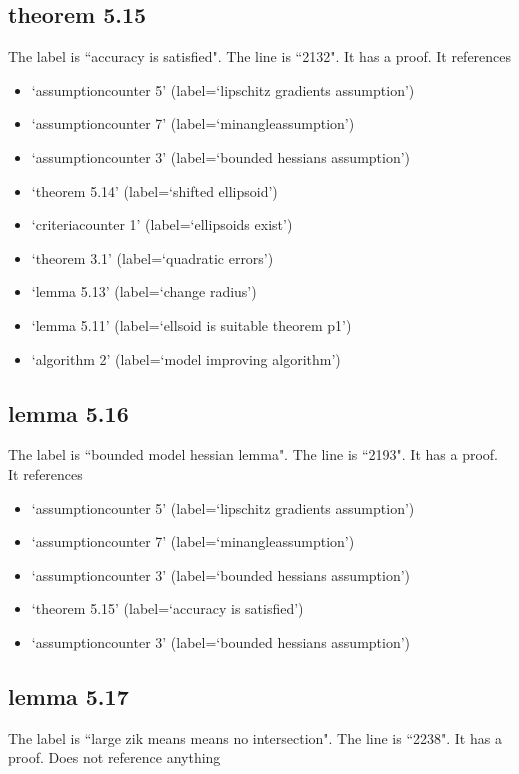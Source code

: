 \documentclass{article}
\begin{document}
\subsection{theorem 5.15}
The label is ``accuracy is satisfied".
The line is ``2132".
It has a proof.
It references \begin{itemize}
\item `assumptioncounter 5' (label=`lipschitz gradients assumption')
\item `assumptioncounter 7' (label=`minangleassumption')
\item `assumptioncounter 3' (label=`bounded hessians assumption')
\item `theorem 5.14' (label=`shifted ellipsoid')
\item `criteriacounter 1' (label=`ellipsoids exist')
\item `theorem 3.1' (label=`quadratic errors')
\item `lemma 5.13' (label=`change radius')
\item `lemma 5.11' (label=`ellsoid is suitable theorem p1')
\item `algorithm 2' (label=`model improving algorithm')
\end{itemize}
\subsection{lemma 5.16}
The label is ``bounded model hessian lemma".
The line is ``2193".
It has a proof.
It references \begin{itemize}
\item `assumptioncounter 5' (label=`lipschitz gradients assumption')
\item `assumptioncounter 7' (label=`minangleassumption')
\item `assumptioncounter 3' (label=`bounded hessians assumption')
\item `theorem 5.15' (label=`accuracy is satisfied')
\item `assumptioncounter 3' (label=`bounded hessians assumption')
\end{itemize}
\subsection{lemma 5.17}
The label is ``large zik means means no intersection".
The line is ``2238".
It has a proof.
Does not reference anything
\end{document}
